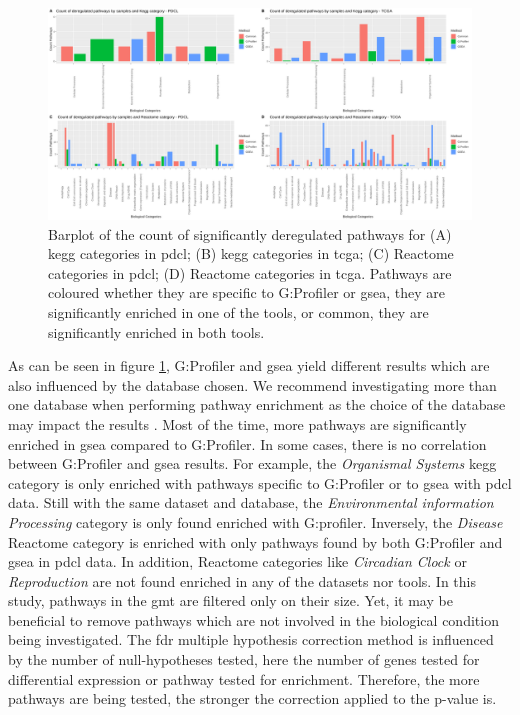 \begin{figure}
    \includegraphics[width=\textwidth]{img/barplot-categ-global}
    \caption{
        Barplot of the count of significantly deregulated pathways for (A) \acrshort{kegg} categories in \acrshort{pdcl}; (B) \acrshort{kegg} categories in \acrshort{tcga}; (C) Reactome categories in \acrshort{pdcl}; (D) Reactome categories in \acrshort{tcga}.
        Pathways are coloured whether they are specific to G:Profiler or \acrshort{gsea}, they are significantly enriched in one of the tools, or common, they are significantly enriched in both tools.
    }
    \label{fig:barplot-categ-global}
\end{figure}

As can be seen in figure \ref*{fig:barplot-categ-global}, G:Profiler and \acrshort{gsea} yield different results which are also influenced by the database chosen.
We recommend investigating more than one database when performing pathway enrichment as the choice of the database may impact the results \cite*{Mubeen2019}.
Most of the time, more pathways are significantly enriched in \acrshort{gsea} compared to G:Profiler.
In some cases, there is no correlation between G:Profiler and \acrshort{gsea} results.
For example, the \textit{Organismal Systems} \acrshort{kegg} category is only enriched with pathways specific to G:Profiler or to \acrshort{gsea} with \acrshort{pdcl} data.
Still with the same dataset and database, the \textit{Environmental information Processing} category is only found enriched with G:profiler.
Inversely, the \textit{Disease} Reactome category is enriched with only pathways found by both G:Profiler and \acrshort{gsea} in \acrshort{pdcl} data.
In addition, Reactome categories like \textit{Circadian Clock} or \textit{Reproduction} are not found enriched in any of the datasets nor tools.
In this study, pathways in the \acrshort{gmt} are filtered only on their size.
Yet, it may be beneficial to remove pathways which are not involved in the biological condition being investigated.
The \acrshort{fdr} multiple hypothesis correction method is influenced by the number of null-hypotheses tested, here the number of genes tested for differential expression or pathway tested for enrichment.
Therefore, the more pathways are being tested, the stronger the correction applied to the p-value is.

